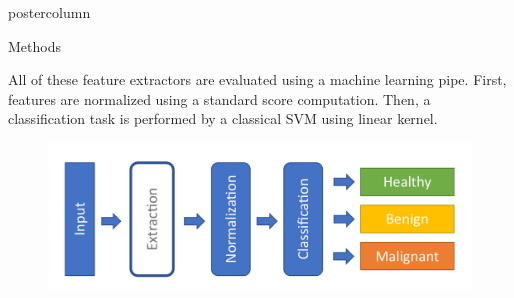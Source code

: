 \documentclass[final]{beamer}
\begin{document}
\begin{frame}
\begin{columns}[t]
\begin{column}{.49\textwidth}
\begin{beamercolorbox}[center,wd=\textwidth]{postercolumn}
\begin{minipage}[T]{.95\textwidth}
{\begin{block}{Methods}
\begin{figure}[h]
                  \label{fig:method_used}
                \end{figure}
                All of these feature extractors are evaluated using a machine learning pipe. First, features are normalized using a standard score computation. Then, a classification task is performed by a classical SVM using linear kernel.\par
                \begin{figure}[h]
                \centering
                  \includegraphics[width=.9\linewidth]{content/figures/Process.pdf}
                  \label{fig:pipeline}
                \end{figure}
            \end{block}       
           }
        \end{minipage}
      \end{beamercolorbox}
    \end{column}
    

\end{columns}
\end{frame}
\end{document}
